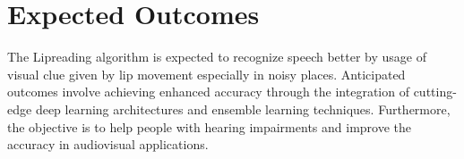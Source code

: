 \chapter{Expected Outcomes}
The Lipreading algorithm is expected to recognize speech better by usage of visual clue given by lip movement especially in noisy places. Anticipated outcomes involve achieving enhanced accuracy through the integration of cutting-edge deep learning architectures and ensemble learning techniques. Furthermore, the objective is to help people with hearing impairments and improve the accuracy in audiovisual applications.